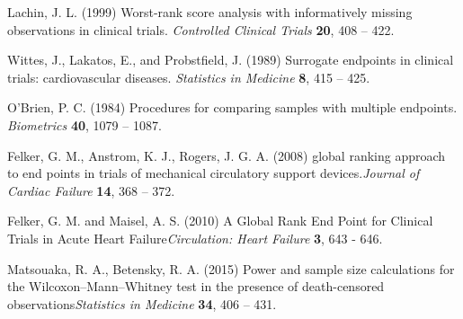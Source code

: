 \documentclass[bimj,fleqn]{w-art}\usepackage[]{graphicx}\usepackage[]{color}
\theoremstyle{plain}
\theoremstyle{definition}
\begin{document}
  \begin{thebibliography}{10}

  Lachin, J. L. (1999) Worst-rank score analysis with informatively missing observations in clinical trials.  \textit{Controlled Clinical Trials} \textbf{20}, 408 – 422.

  Wittes, J., Lakatos, E., and Probstfield, J. (1989) Surrogate endpoints in clinical trials: cardiovascular diseases. \textit{Statistics in Medicine} \textbf{8}, 415 – 425.

   O'Brien, P. C. (1984) Procedures for comparing samples with multiple endpoints. \textit{Biometrics} \textbf{40}, 1079 – 1087.

 Felker, G. M., Anstrom, K. J., Rogers, J. G. A. (2008) global ranking approach to end points in trials of mechanical circulatory support devices.\textit{Journal of Cardiac Failure} \textbf{14}, 368 – 372.

 Felker, G. M. and Maisel, A. S. (2010) A Global Rank End Point for Clinical Trials in Acute Heart Failure\textit{Circulation: Heart Failure} \textbf{3}, 643 - 646.

 Matsouaka, R. A., Betensky, R. A. (2015) Power and sample size calculations for the Wilcoxon–Mann–Whitney test in the presence of death-censored observations\textit{Statistics in Medicine} \textbf{34}, 406 – 431.


  \end{thebibliography}
  \newpage
  \phantom{aaaa}
  
\end{document}
